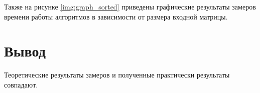 Также на рисунке \ref{img:graph_sorted} приведены графические результаты замеров времени работы алгоритмов в зависимости от размера входной матрицы.

\begin{center}
	\label{img:graph_sorted}
\end{center}
\newpage


\section*{Вывод}


Теоретические результаты замеров и полученные практически результаты совпадают.